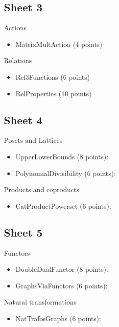 \subsection{Sheet 3}

Actions
\begin{itemize}
	\item MatrixMultAction (4 points) 
\end{itemize}

Relations
\begin{itemize}
	\item Rel3Functions (6 points) 
	\item RelProperties (10 points) 
\end{itemize}

\subsection{Sheet 4}

Posets and Lattices
\begin{itemize}
	\item UpperLowerBounds (8 points): 
	\item PolynomialDivisibility (6 points):  
\end{itemize}

Products and coproducts
\begin{itemize}
	\item CatProductPowerset (6 points): 
\end{itemize}

\subsection{Sheet 5}

Functors
\begin{itemize}
	\item DoubleDualFunctor (8 points): 
	\item GraphsViaFunctors (6 points): 
\end{itemize}

Natural transformations
\begin{itemize}
	\item NatTrafosGraphs (6 points): 

\end{itemize}

